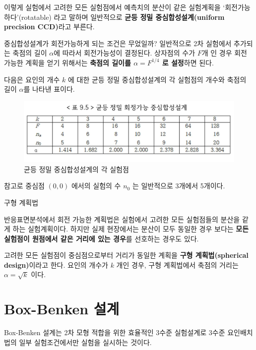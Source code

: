 \documentclass[
]{book}
\makeatletter
\newenvironment{kframe}{%
\medskip{}
\setlength{\fboxsep}{.8em}
 \def\at@end@of@kframe{}%
 \ifinner\ifhmode%
  \def\at@end@of@kframe{\end{minipage}}%
  \begin{minipage}{\columnwidth}%
 \fi\fi%
 \def\FrameCommand##1{\hskip\@totalleftmargin \hskip-\fboxsep
 \colorbox{shadecolor}{##1}\hskip-\fboxsep
     \hskip-\linewidth \hskip-\@totalleftmargin \hskip\columnwidth}%
 \MakeFramed {\advance\hsize-\width
   \@totalleftmargin\z@ \linewidth\hsize
   \@setminipage}}%
 {\par\unskip\endMakeFramed%
 \at@end@of@kframe}
\newenvironment{rmdblock}[1]
  {
  \begin{itemize}
  \renewcommand{\labelitemi}{
    \raisebox{-.7\height}[0pt][0pt]{
      {\setkeys{Gin}{width=3em,keepaspectratio}\texttt{[image: images/\#1]}}
    }
  }
  \setlength{\fboxsep}{1em}
  \begin{kframe}
  \item
  }
  {
  \end{kframe}
  \end{itemize}
  }
\newenvironment{rmdnote}
  {\begin{rmdblock}{note}}
  {\end{rmdblock}}
\theoremstyle{definition}
\theoremstyle{definition}
\theoremstyle{definition}
\theoremstyle{definition}
\theoremstyle{remark}
\makeatother
\begin{document}
이렇게 실험에서 고려한 모든 실험점에서 예측치의 분산이 같은
실험계획을 `회전가능하다'(rotatable) 라고 말하며 일반적으로 \textbf{균등 정밀 중심합성설계(uniform precision CCD)}라고 부른다.

중심합성설계가 회전가능하게 되는 조건은 무었일까? 일반적으로 2차 실험에서 추가되는
축점의 길이 \(\alpha\)에 따라서 회전가능성이 결정된다. 상자점의 수가 \(F\)개 인 경우 회전 가능한 계획을 얻기 위해서는 \textbf{축점의 길이를 \(\alpha= F^{1/4}\) 로 설정}하면 된다.

다음은 요인의 개수 \(k\) 에 대한 균등 정밀 중심합성설계의 각 실험점의 개수와 축점의 길이 \(\alpha\)를
나타낸 표이다.

\begin{figure}

{\centering \includegraphics[width=0.8\linewidth]{myimages/ccc-points} 

}

\caption{균등 정밀 중심합성설계의 각 실험점}\label{fig:unnamed-chunk-26}
\end{figure}

참고로 중심점 \((0,0)\) 에서의 실험의 수 \(n_0\) 는 일반적으로 3개에서 5개이다.

\begin{rmdnote}
구형 계획법

반응표면분석에서 회전 가능한 계획법은 실험에서 고려한 모든 실험점들의 분산을 같게 하는
실험계획이다. 하지만 실제 현장에서는 분산이 모두 동일한 경우 보다는 \textbf{모든 실험점이 원점에서 같은 거리에 있는 경우}를 선호하는 경우도 있다.

고려한 모든 실험점이 중심점으로부터 거리가 동일한 계획을 \textbf{구형 계획법(spherical design)}이라고 한다. 요인의 개수가 \(k\) 개인 경우, 구형 계획법에서 축점의 거리는 \(\alpha=\sqrt{k}\) 이다.\\
\end{rmdnote}

\hypertarget{box-benken-uxc124uxacc4}{%
\section{Box-Benken 설계}\label{box-benken-uxc124uxacc4}}

Box-Benken 설계는 2차 모형 적합을 위한 효율적인 3수준 실험설계로 3수준 요인배치법의 일부 실험조건에서만 실험을 실시하는 것이다.
\end{document}
